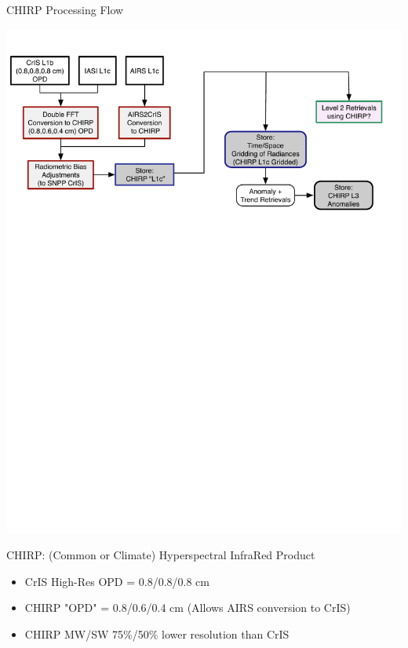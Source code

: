 \documentclass[10pt,t]{beamer}
\begin{document}
\begin{frame}[label={sec:org5ae10d0}]{CHIRP Processing Flow}
\vspace{-0.2in}
\begin{center}
\includegraphics[width=1.0\linewidth]{./airs2cris_stm_talk1_landscape.pdf}
\end{center}

CHIRP: (Common or Climate) Hyperspectral InfraRed Product

\vspace{0.05in}

\small
\begin{itemize}
\item CrIS High-Res OPD = 0.8/0.8/0.8 cm
\item CHIRP "OPD" = 0.8/0.6/0.4 cm  \hspace{0.1in} (Allows AIRS conversion to CrIS)
\item CHIRP MW/SW 75\%/50\% lower resolution than CrIS
\end{itemize}
\end{frame}
\end{document}
